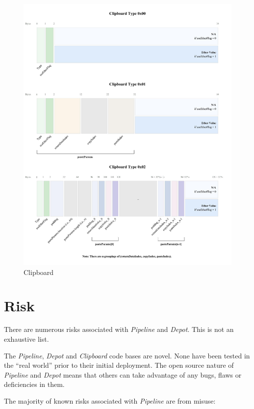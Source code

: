 \documentclass[tikz]{article}
\newcommand{\term}[1]{\textsl{#1}}
\begin{document}
\begin{figure}[h!]
    \centering
    \hspace*{-8mm} 
    \includegraphics[scale=.29]{Figure2}
    \caption{Clipboard}
    \label{fig 2}
\end{figure}

\newpage
\section{Risk}
There are numerous risks associated with \term{Pipeline} and \term{Depot}. This is not an exhaustive list.

The \term{Pipeline}, \term{Depot} and \term{Clipboard} code bases are novel. None have been tested in the “real world” prior to their initial deployment. The open source nature of \term{Pipeline} and \term{Depot} means that others can take advantage of any bugs, flaws or deficiencies in them.

The majority of known risks associated with \term{Pipeline} are from misuse:
\end{document}
